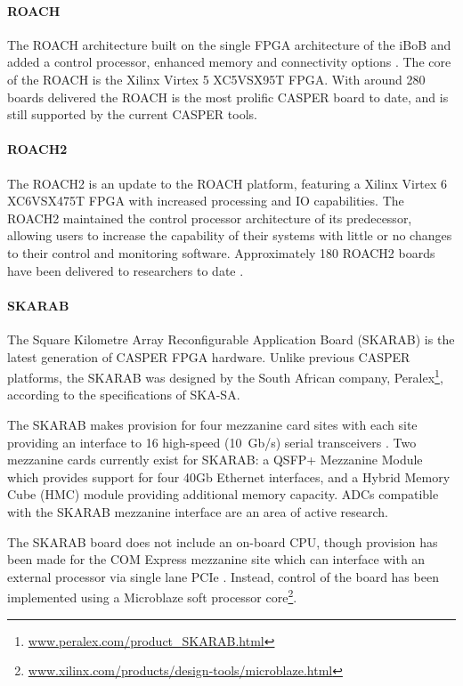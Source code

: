 \documentclass{ws-jai}
\begin{document}
\paragraph*{ROACH}
The ROACH architecture built on the single FPGA architecture of the iBoB and added a control processor, enhanced memory and connectivity options \citep{Casp09}. The core of the ROACH is the Xilinx Virtex 5 XC5VSX95T FPGA. With around 280 boards delivered \citep{private-mo} the ROACH is the most prolific CASPER board to date, and is still supported by the current CASPER tools.
\paragraph*{ROACH2}
The ROACH2 is an update to the ROACH platform, featuring a Xilinx Virtex 6 XC6VSX475T FPGA with increased processing and IO capabilities. The ROACH2 maintained the control processor architecture of its predecessor, allowing users to increase the capability of their systems with little or no changes to their control and monitoring software. Approximately 180 ROACH2 boards have been delivered to researchers to date \citep{private-mo}.
\paragraph*{SKARAB}
The Square Kilometre Array Reconfigurable Application Board (SKARAB) is the latest generation of CASPER FPGA hardware. Unlike previous CASPER platforms, the SKARAB was designed by the South African company, Peralex\footnote{\url{www.peralex.com/product_SKARAB.html}}, according to the specifications of SKA-SA.

The SKARAB makes provision for four mezzanine card sites with each site providing an interface to 16 high-speed (10~Gb/s) serial transceivers \citep{cliff16}.
Two mezzanine cards currently exist for SKARAB: a QSFP+ Mezzanine Module which provides support for four 40Gb Ethernet interfaces, and a Hybrid Memory Cube (HMC) module providing additional memory capacity. ADCs compatible with the SKARAB mezzanine interface are an area of active research.

The SKARAB board does not include an on-board CPU, though provision has been made for the COM Express mezzanine site which can interface with an external processor via single lane PCIe \citep{Teag15}. Instead, control of the board has been implemented using a Microblaze soft processor core\footnote{\url{www.xilinx.com/products/design-tools/microblaze.html}}.
\end{document}
